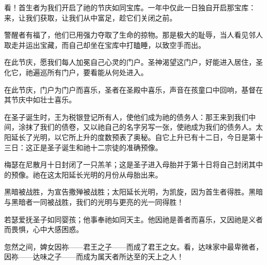 看！首生者为我们开启了祂的节庆如同宝库。一年中仅此一日独自开启那宝库：来，让我们获取，让我们从中富足，趁它们关闭之前。\par

警醒者有福了，他们已用强力夺取了生命的掠物。那是极大的耻辱，当人看见邻人取走并运出宝藏，而自己却坐在宝库中打瞌睡，以致空手而出。\par

在此节庆，愿我们每人加冕自己心灵的门户。圣神渴望这门户，好能进入居住，圣化它，祂遍巡所有门户，要看能从何处进入。\par

在此节庆，门户为门户而喜乐，圣者在圣殿中喜乐，声音在孩童口中回响，基督在其节庆中如壮士喜乐。\par

在圣子诞生时，王为税银登记所有人，使他们成为祂的债务人：那王来到我们中间，涂抹了我们的债卷，又以祂自己的名字另写一张，使祂成为我们的债务人。太阳延长了光明，以它所上升的度数预表了奥秘。自它上升已有十二日，今日是第十三日：这正是圣子诞生和祂十二宗徒的准确预像。\par

梅瑟在尼散月十日封闭了一只羔羊；这是圣子进入母胎并于第十日将自己封闭其中的预像。祂在这太阳延长光明的月份从母胎出来。\par

黑暗被战胜，为宣告撒殚被战胜；太阳延长光明，为凯旋，因为首生者得胜。黑暗与黑暗者一同被战胜，我们的光明与更亮的光一同得胜！\par

若瑟爱抚圣子如同婴孩；他事奉祂如同天主。他因祂是善者而喜乐，又因祂是义者而畏惧，心中大感困惑。\par

\par

\par

\par

忽然之间，婢女因祢——君王之子——而成了君王之女。看，达味家中最卑微者，因祢——达味之子——而成为属天者所达至的天上之人！\par

